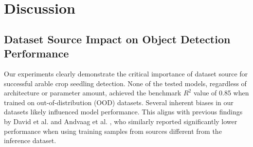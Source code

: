 \documentclass[12pt,a4paper,oneside]{report}
\begin{document}


\section{Discussion}

\subsection{Dataset Source Impact on Object Detection Performance}
Our experiments clearly demonstrate the critical importance of dataset source 
for successful arable crop seedling detection. None of the tested models, regardless 
of architecture or parameter amount, achieved the benchmark $R^2$ value of 0.85 
when trained on out-of-distribution (OOD) datasets. 
Several inherent biases in our datasets likely influenced model performance.
This aligns with previous findings 
by David et al. \cite{davidPlantDetectionCounting2021}  and Andvaag et al. \cite{andvaagCountingCanolaGeneralizable2024}, 
who similarly reported significantly 
lower performance when using training samples from sources different from the inference dataset.
\end{document}
